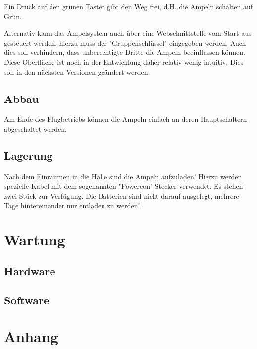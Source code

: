 \documentclass[a4paper, ngerman]{scrartcl}
\begin{document}
Ein Druck auf den grünen Taster gibt den Weg frei, d.H. die Ampeln schalten auf Grün.

Alternativ kann das Ampelsystem auch über eine Webschnittstelle vom Start aus gesteuert werden, hierzu muss der "{}Gruppenschlüssel"{} eingegeben werden. Auch dies soll verhindern, dass unberechtigte Dritte die Ampeln beeinflussen können. Diese Oberfläche ist noch in der Entwicklung daher relativ wenig intuitiv. Dies soll in den nächsten Versionen geändert werden.

\subsection{Abbau}
Am Ende des Flugbetriebs können die Ampeln einfach an deren Hauptschaltern abgeschaltet werden.

\subsection{Lagerung}
Nach dem Einräumen in die Halle sind die Ampeln aufzuladen! Hierzu werden spezielle Kabel mit dem sogenannten "{}Powercon"{}-Stecker verwendet. Es stehen zwei Stück zur Verfügung. Die Batterien sind nicht darauf ausgelegt, mehrere Tage hintereinander nur entladen zu werden!

\section{Wartung}
\subsection{Hardware}
\subsection{Software}

\section{Anhang}
\end{document}

